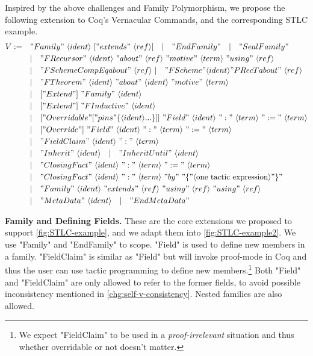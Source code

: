 Inspired by the above challenges and Family Polymorphism, we propose
the following extension to Coq's Vernacular Commands, and the corresponding STLC example.
\begin{align*}
  V := \quad &"Family"~\langle ident\rangle~["extends"~\langle ref\rangle] 
  \quad |\quad "EndFamily" \quad | \quad "SealFamily" \\
  & |\quad "FRecursor"~\langle ident\rangle~"about"~\langle ref\rangle~"motive"~\langle term\rangle~"using"~\langle ref\rangle \\
  & |\quad "FScheme CompEq about"~\langle ref \rangle~|\quad "FScheme " \langle ident\rangle " PRecT about"~\langle ref \rangle\\
  & | \quad "FTheorem"~\langle ident\rangle~"about"~\langle ident\rangle~"motive"~\langle term\rangle \\
  & |\quad ["Extend"]~"Family"~\langle ident\rangle \\ 
  & |\quad ["Extend"]~"FInductive"~\langle ident\rangle \\ 
  & |\quad ["Overridable " ["pins " \{ \langle ident\rangle ... \}]]~"Field"~\langle ident\rangle~":"~\langle term \rangle~":="~\langle term \rangle \\
  & |\quad ["Override"]~"Field"~\langle ident\rangle~":"~\langle term \rangle~":="~\langle term \rangle \\
  & | \quad "FieldClaim"~\langle ident\rangle~":"~\langle term \rangle \\
  & | \quad "Inherit"~\langle ident\rangle \quad | \quad "Inherit Until"~\langle ident\rangle \quad \\
  & | \quad "Closing Fact"~\langle ident\rangle~":"~\langle term \rangle~":="~\langle term \rangle \\ 
  & | \quad "Closing Fact"~\langle ident\rangle~":"~\langle term \rangle~"by"~"\{"\langle \text{one tactic expression}\rangle"\}" \\ 
  & | \quad "Family"~\langle ident\rangle~"extends"~\langle ref\rangle~"using"~\langle ref\rangle~"using"~\langle ref\rangle \\ 
  & | \quad "MetaData"~\langle ident\rangle \quad | \quad "EndMetaData" \\ 
\end{align*}

\textbf{Family and Defining Fields.} These are the core extensions we proposed to support \cref{fig:STLC-example}, and we adapt them into \cref{fig:STLC-example2}. We use "Family" and "EndFamily" to scope. "Field" is used to define new members in a family. "FieldClaim" is similar as "Field" but will invoke proof-mode in Coq and thus the user can use tactic programming to define new members.\footnote{We expect "FieldClaim" to be used in a \textit{proof-irrelevant} situation and thus whether overridable or not doesn't matter.} Both "Field" and "FieldClaim" are only allowed to refer to the former fields, to avoid possible inconsistency mentioned in \ref{chg:self-v-consistency}.
Nested families are also allowed. 


